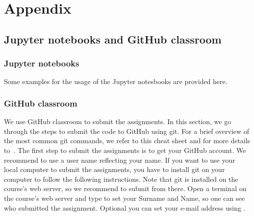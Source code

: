 \documentclass[11pt,fleqn]{book} %
\begin{document}
\newpage
\theendnotes

\part{Appendix}

\chapter*{Jupyter notebooks and GitHub classroom}

\section*{Jupyter notebooks}

Some examples for the usage of the Jupyter notesbooks are provided here.

\section*{GitHub classroom}

We use GitHub classroom to submit the assignments. In this section, we go through the steps to submit the code to GitHub using git. For a brief overview of the most common git commands, we refer to this cheat sheet and for more details to~\cite{silverman2013git,laster2016professional}. The first step to submit the assignments is to get your GitHub account. We recommend to use a user name reflecting your name. If you want to use your local computer to submit the assignments, you have to install git on your computer to follow the following instructions. Note that git is installed on the course's web server, so we recommend to submit from there. Open a terminal on the course's web server and type  to set your Surname and Name, so one can see who submitted the assignment. Optional you can set your e-mail address using . \\
\end{document}
